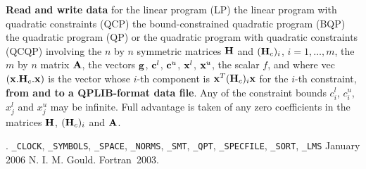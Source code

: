\documentclass{galahad}
\newcommand{\packagename}{RPD}
\newcommand{\fullpackagename}{\libraryname\_\packagename}
\begin{document}
\galheader


\galsummary
{\bf Read and write data} for the linear program (LP)
the linear program with quadratic constraints (QCP)
the bound-constrained quadratic program (BQP)
the quadratic program (QP)
or the quadratic program with quadratic constraints (QCQP)
involving the $n$ by $n$ symmetric matrices ${\mathbf{H}}$
and $({\mathbf{H}}_c)_i$, $i = 1,\ldots,m$, the $m$ by $n$ matrix ${\mathbf{A}}$,
the vectors ${\mathbf{g}}$, ${\mathbf{c}}^{l}$, ${\mathbf{c}}^{u}$, ${\mathbf{x}}^{l}$,
${\mathbf{x}}^{u}$, the scalar $f$, and
where vec$( {\mathbf{x}} . {\mathbf{H}}_c . {\mathbf{x}} )$ is the vector whose
$i$-th component is  ${\mathbf{x}}^T ({\mathbf{H}}_c)_i {\mathbf{x}}$ for the $i$-th constraint,
{\bf from and to a QPLIB-format data file}.
Any of the constraint bounds $c_{i}^{l}$, $c_{i}^{u}$,
$x_{j}^{l}$ and $x_{j}^{u}$ may be infinite.
Full advantage is taken of any zero coefficients in the matrices ${\mathbf{H}}$,
$({\mathbf{H}}_c)_i$ and ${\mathbf{A}}$.


\galattributes
\galversions{\tt  \fullpackagename\_single, \fullpackagename\_double}.
\galuses
{\tt \libraryname\_CLOCK},
{\tt \libraryname\_SY\-M\-BOLS},
{\tt \libraryname\_SPACE}, {\tt \libraryname\_\-NORMS},
{\tt \libraryname\_\-SMT},
{\tt \libraryname\_\-QPT},
{\tt \libraryname\_SPECFILE},
{\tt \libraryname\_SORT},
{\tt \libraryname\_LMS}
\galdate January 2006
\galorigin N. I. M. Gould.
\gallanguage Fortran~2003.


\galhowto
\end{document}
